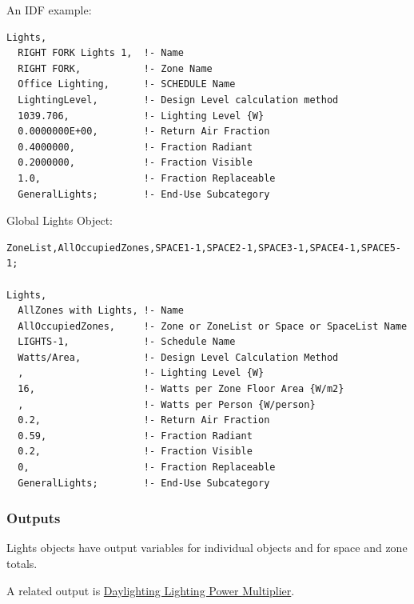 An IDF example:

\begin{lstlisting}
Lights,
  RIGHT FORK Lights 1,  !- Name
  RIGHT FORK,           !- Zone Name
  Office Lighting,      !- SCHEDULE Name
  LightingLevel,        !- Design Level calculation method
  1039.706,             !- Lighting Level {W}
  0.0000000E+00,        !- Return Air Fraction
  0.4000000,            !- Fraction Radiant
  0.2000000,            !- Fraction Visible
  1.0,                  !- Fraction Replaceable
  GeneralLights;        !- End-Use Subcategory
\end{lstlisting}

Global Lights Object:

\begin{lstlisting}
ZoneList,AllOccupiedZones,SPACE1-1,SPACE2-1,SPACE3-1,SPACE4-1,SPACE5-1;

Lights,
  AllZones with Lights, !- Name
  AllOccupiedZones,     !- Zone or ZoneList or Space or SpaceList Name
  LIGHTS-1,             !- Schedule Name
  Watts/Area,           !- Design Level Calculation Method
  ,                     !- Lighting Level {W}
  16,                   !- Watts per Zone Floor Area {W/m2}
  ,                     !- Watts per Person {W/person}
  0.2,                  !- Return Air Fraction
  0.59,                 !- Fraction Radiant
  0.2,                  !- Fraction Visible
  0,                    !- Fraction Replaceable
  GeneralLights;        !- End-Use Subcategory
\end{lstlisting}

\subsubsection{Outputs}\label{outputs-2-012}

Lights objects have output variables for individual objects and for space and zone totals.

A related output is \hyperref[daylighting-lighting-power-multiplier-1]{Daylighting Lighting Power Multiplier}.

